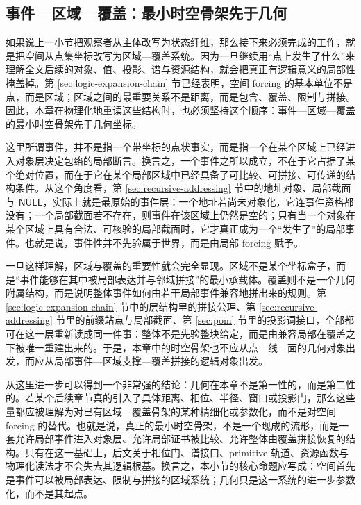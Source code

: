 \subsection{事件—区域—覆盖：最小时空骨架先于几何}\label{subsec:physical-spacetime-skeleton-event-region-cover}

如果说上一小节把观察者从主体改写为状态纤维，那么接下来必须完成的工作，就是把空间从点集坐标改写为区域—覆盖系统。因为一旦继续用“点上发生了什么”来理解全文后续的对象、值、投影、谱与资源结构，就会把真正有逻辑意义的局部性掩盖掉。第 \ref{sec:logic-expansion-chain} 节已经表明，空间 forcing 的基本单位不是点，而是区域；区域之间的最重要关系不是距离，而是包含、覆盖、限制与拼接。因此，本章在物理化地重读这些结构时，也必须坚持这个顺序：事件—区域—覆盖的最小时空骨架先于几何坐标。

这里所谓事件，并不是指一个带坐标的点状事实，而是指一个在某个区域上已经进入对象层决定包络的局部断言。换言之，一个事件之所以成立，不在于它占据了某个绝对位置，而在于它在某个局部区域中已经具备了可比较、可拼接、可传递的结构条件。从这个角度看，第 \ref{sec:recursive-addressing} 节中的地址对象、局部截面与 \(\mathsf{NULL}\)，实际上就是最原始的事件层：一个地址若尚未对象化，它连事件资格都没有；一个局部截面若不存在，则事件在该区域上仍然是空的；只有当一个对象在某个区域上具有合法、可核验的局部截面时，它才真正成为一个“发生了”的局部事件。也就是说，事件性并不先验属于世界，而是由局部 forcing 赋予。

一旦这样理解，区域与覆盖的重要性就会完全显现。区域不是某个坐标盒子，而是“事件能够在其中被局部表达并与邻域拼接”的最小承载体。覆盖则不是一个几何附属结构，而是说明整体事件如何由若干局部事件兼容地拼出来的规则。第 \ref{sec:logic-expansion-chain} 节中的层结构里的拼接公理、第 \ref{sec:recursive-addressing} 节里的前缀站点与局部截面、第 \ref{sec:pom} 节里的投影词接口，全部都可在这一层重新读成同一件事：整体不是先验整块给定，而是由兼容局部在覆盖之下被唯一重建出来的。于是，本章中的时空骨架也不应从点—线—面的几何对象出发，而应从局部事件—区域支撑—覆盖拼接的逻辑对象出发。

从这里进一步可以得到一个非常强的结论：几何在本章不是第一性的，而是第二性的。若某个后续章节真的引入了具体距离、相位、半径、窗口或投影门，那么这些量都应被理解为对已有区域—覆盖骨架的某种精细化或参数化，而不是对空间 forcing 的替代。也就是说，真正的最小时空骨架，不是一个现成的流形，而是一套允许局部事件进入对象层、允许局部证书被比较、允许整体由覆盖拼接恢复的结构。只有在这一基础上，后文关于相位门、谱接口、primitive 轨道、资源函数与物理化读法才不会失去其逻辑根基。换言之，本小节的核心命题应写成：空间首先是事件可以被局部表达、限制与拼接的区域系统；几何只是这一系统的进一步参数化，而不是其起点。

